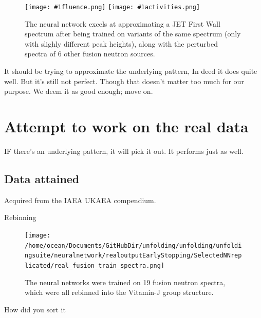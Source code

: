 \documentclass[a4paper, 12pt]{article}
\newcommand{\fluenceandactivities}[1]{
\texttt{[image: \#1fluence.png]}
\texttt{[image: \#1activities.png]}
}
\begin{document}
\begin{figure}
\centering
\fluenceandactivities{/home/ocean/Documents/GitHubDir/unfolding/unfolding/unfoldingsuite/neuralnetwork/simulated_data/lossabove1e1/0918_0207_2_layer_256_256_mse_test_262_}
\caption{The neural network excels at approximating a JET First Wall  spectrum after being trained on variants of the same spectrum (only with slighly different peak heights), along with the perturbed spectra of 6 other fusion neutron sources.} \label{SimulatedExample}
\end{figure}

It should be trying to approximate the underlying pattern,
In deed it does quite well.
But it's still not perfect.
Though that doesn't matter too much for our purpose. We deem it as good enough; move on.

\section{Attempt to work on the real data}

IF there's an underlying pattern, it will pick it out.
It performs just as well.

\subsection{Data attained}
Acquired from the IAEA UKAEA compendium.


Rebinning

\begin{figure}
\centering
\texttt{[image: /home/ocean/Documents/GitHubDir/unfolding/unfolding/unfoldingsuite/neuralnetwork/realoutputEarlyStopping/SelectedNNreplicated/real\_fusion\_train\_spectra.png]}
\caption{The neural networks were trained on 19 fusion neutron spectra, which were all rebinned into the Vitamin-J group structure.}\label{RealFusionTrain}
\end{figure}

How did you sort it
\end{document}
